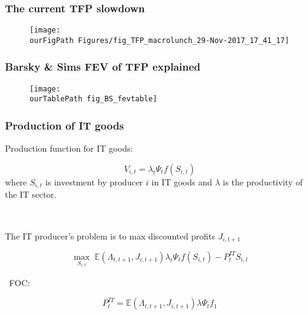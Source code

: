 \documentclass{beamer}
\def \ourFigPath {../../}
\def \ourTablePath {../../Tables/}
\begin{document}

\begin{frame}
	\frametitle{The current TFP slowdown}
	
	
	\vspace{-1cm}
	\noindent
	\begin{figure}
		\centering
		\texttt{[image: \\ourFigPath Figures/fig\_TFP\_macrolunch\_29-Nov-2017\_17\_41\_17]}
	\end{figure}
	
	
\end{frame}


\begin{frame}
	\frametitle{Barsky \& Sims FEV of TFP explained}
	\label{BS_FEV}
	

\vspace{-1cm}
\noindent
\begin{figure}
\centering
\texttt{[image: \\ourTablePath fig\_BS\_fevtable]}
\end{figure}
	
\hyperlink{related_lit}{}	
\end{frame}

\begin{frame}
	\frametitle{Production of IT goods}
	\label{it_sector}
	
Production function for IT goods:

\begin{equation}
V_{i,t} = \lambda_t \Psi_t f(S_{i,t}) 
\end{equation}
where $S_{i,t}$ is investment by producer $i$ in IT goods and $\lambda$ is the productivity of the IT sector. 

\

The IT producer's problem is to max discounted profits $J_{i,t+1}$

\begin{equation}
\max_{S_{i,t}} \; \mathbb{E}(\Lambda_{t,t+1},J_{i,t+1})\lambda_t \Psi_t f(S_{i,t}) - P^{IT}_t S_{i,t}
\end{equation}

\
FOC: 

\begin{equation}
P^{IT}_t = \mathbb{E}(\Lambda_{t,t+1},J_{i,t+1})\lambda \Psi_t f_1
\end{equation}
	
\hyperlink{expanding_variety}{}	
\end{frame}
\end{document}
